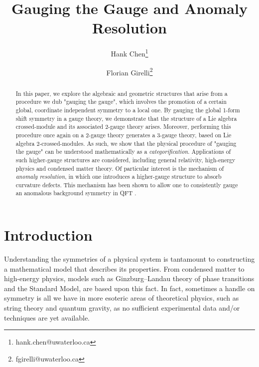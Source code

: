 \documentclass[onecolumn]{article}
\theoremstyle{theorem}
\theoremstyle{remark}
\theoremstyle{example}
\theoremstyle{definition}
\numberwithin{equation}{section}
\begin{document}
\title{Gauging the Gauge and Anomaly Resolution}
\author[1,2]{{ \sf Hank Chen}\thanks{hank.chen@uwaterloo.ca}}
\author[1]{{\sf Florian Girelli}\thanks{fgirelli@uwaterloo.ca}}


\maketitle

\begin{abstract}
    In this paper, we explore the algebraic and geometric structures that arise from a procedure we dub "gauging the gauge", which involves the promotion of a certain global, coordinate independent symmetry to a local one. By gauging the global 1-form shift symmetry in a gauge theory, we demonstrate that the structure of a {Lie algebra crossed-module} and its associated 2-gauge theory arises. Moreover, performing this procedure once again on a 2-gauge theory generates a 3-gauge theory, based on {Lie algebra 2-crossed-modules}. As such, we show that the physical procedure of "gauging the gauge" can be understood mathematically as a \textit{categorification}. Applications of such higher-gauge structures are considered, including general relativity, high-energy physics and condensed matter theory. Of particular interest is the mechanism of \textit{anomaly resolution}, in which one introduces a higher-gauge structure to absorb curvature defects. This mechanism has been shown to allow one to consistently gauge an anomalous background symmetry in QFT 
    . 
\end{abstract}

\tableofcontents
\setcounter{section}{-1}

\section{Introduction}
{Understanding}  the symmetries of a physical system is tantamount to constructing a mathematical model that describes its properties. From condensed matter to high-energy physics, models such as Ginzburg--Landau theory of phase transitions and the Standard Model, are based upon this fact. In fact, sometimes a handle on symmetry is all we have in more esoteric areas of theoretical physics, such as string theory and quantum gravity, as no sufficient experimental data and/or techniques are yet available.
\end{document}
